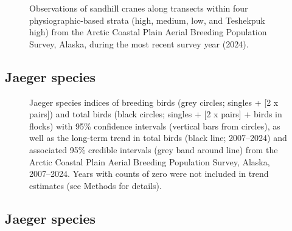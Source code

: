 \documentclass[
]{article}
\begin{document}
\begin{figure}


\caption{\label{fig-SACRmap}Observations of sandhill cranes along
transects within four physiographic-based strata (high, medium, low, and
Teshekpuk high) from the Arctic Coastal Plain Aerial Breeding Population
Survey, Alaska, during the most recent survey year (2024).}

\end{figure}%

\newpage{}

\subsection*{Jaeger species}\label{jaeger-species}

\begin{figure}


\caption{\label{fig-JAEG}Jaeger species indices of breeding birds (grey
circles; singles + {[}2 x pairs{]}) and total birds (black circles;
singles + {[}2 x pairs{]} + birds in flocks) with 95\% confidence
intervals (vertical bars from circles), as well as the long-term trend
in total birds (black line; 2007--2024) and associated 95\% credible
intervals (grey band around line) from the Arctic Coastal Plain Aerial
Breeding Population Survey, Alaska, 2007--2024. Years with counts of
zero were not included in trend estimates (see Methods for details).}

\end{figure}%

\newpage{}

\subsection*{Jaeger species}\label{jaeger-species-1}

\begingroup\fontsize{10}{12}\selectfont
\end{document}
